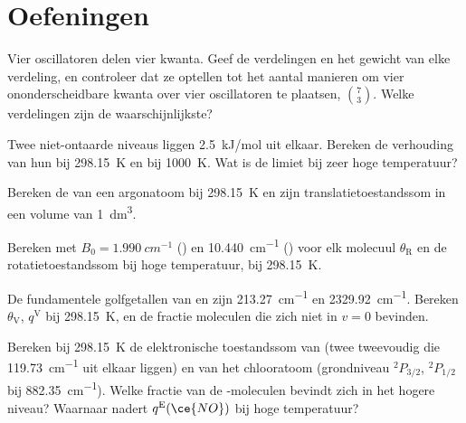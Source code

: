 \section{Oefeningen}

\begin{exercise}[$\star$]\label{exo:b3:partition-functions:1}
Vier oscillatoren delen vier kwanta. Geef de verdelingen en het gewicht
van elke verdeling, en controleer dat ze optellen tot het aantal manieren
om vier ononderscheidbare kwanta over vier oscillatoren te plaatsen, $\binom{7}{3}$. Welke
verdelingen zijn de waarschijnlijkste?
\end{exercise}

\begin{exercise}[$\star$]\label{exo:b3:partition-functions:2}
Twee niet-ontaarde niveaus liggen \qty{2.5}{kJ/mol} uit elkaar. Bereken de
verhouding van hun  bij \qty{298.15}{K} en bij \qty{1000}{K}. Wat
is de limiet bij zeer hoge temperatuur?
\end{exercise}

\begin{exercise}[$\star$]\label{exo:b3:partition-functions:3}
Bereken de  van een argonatoom bij \qty{298.15}{K} en
zijn translatietoestandssom in een volume van \qty{1}{dm^3}.
\end{exercise}

\begin{exercise}[$\star$]\label{exo:b3:partition-functions:4}
Bereken met $B_0 = \qty{1.990}{cm^{-1}}$ () en \qty{10.440}{cm^{-1}} () voor elk
molecuul $\theta_{\mathrm R}$ en de rotatietoestandssom bij hoge
temperatuur, bij
\qty{298.15}{K}.
\end{exercise}

\begin{exercise}[$\star\star$]\label{exo:b3:partition-functions:5}
De fundamentele golfgetallen van  en  zijn \qty{213.27}{cm^{-1}} en
\qty{2329.92}{cm^{-1}}. Bereken $\theta_{\mathrm V}$, $q^{\mathrm V}$ bij \qty{298.15}{K}, en de fractie
moleculen die zich niet in $v = 0$ bevinden.
\end{exercise}

\begin{exercise}[$\star\star$]\label{exo:b3:partition-functions:6}
Bereken bij \qty{298.15}{K} de elektronische toestandssom van  (twee
tweevoudig  die \qty{119.73}{cm^{-1}} uit elkaar liggen) en
van het chlooratoom (grondniveau ${}^2P_{3/2}$, ${}^2P_{1/2}$ bij \qty{882.35}{cm^{-1}}).
Welke fractie van de -moleculen bevindt zich in het hogere niveau?
Waarnaar nadert $q^{\mathrm E}(\ce{NO})$ bij hoge temperatuur?
\end{exercise}

